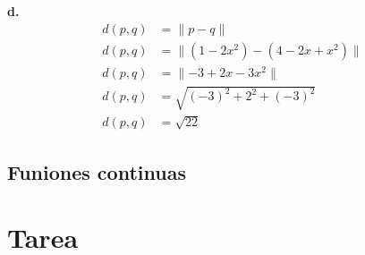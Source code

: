 \documentclass{article}
\begin{document}
            \textbf{d.}
                \begin{align*}
                    d(p,q)&= \parallel p-q\parallel \\
                    d(p,q)&= \parallel (1-2x^{2})-(4-2x+x^{2})\parallel \\
                    d(p,q)&= \parallel -3+2x-3x^{2}\parallel \\
                    d(p,q)&= \sqrt{(-3)^{2}+2^{2}+(-3)^{2}} \\
                    d(p,q)&= \sqrt{22}
                \end{align*}

        \subsection{Funiones continuas}



    \section{Tarea}

    
\end{document}
